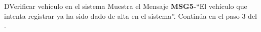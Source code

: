\begin{UCtrayectoriaA}{D}{Verificar vehiculo en el sistema}
	\UCpaso Muestra el Mensaje {\bf MSG5-}``El vehículo que intenta registrar ya ha sido dado de alta en el sistema''.
	\UCpaso Continúa en el paso 3 del .
\end{UCtrayectoriaA}
		
